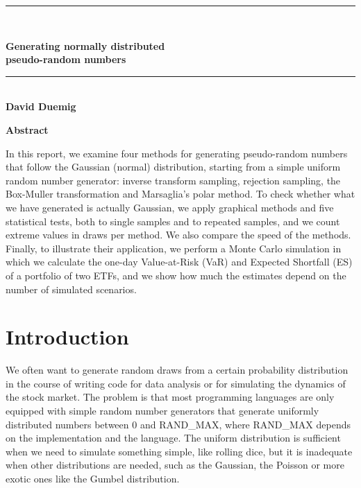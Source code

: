 \documentclass[12pt,a4paper]{article}
\begin{document}
\thispagestyle{empty}
\vspace*{1.2cm}
\begin{center}
\rule{\textwidth}{3pt}\\[2pt]
{\fontsize{20}{24}\selectfont\bfseries Generating normally distributed\\ pseudo-random numbers\par}
\vspace{2pt}
\rule{\textwidth}{1.5pt}\\[14pt]
{\bfseries David Duemig}
\end{center}

\vspace{2.2cm}
\begin{center}
{\fontsize{16}{19}\selectfont\bfseries Abstract}
\end{center}
\vspace{-6pt}
\begin{list}{}{\leftmargin=1.9cm\rightmargin=1.9cm}\item[]
In this report, we examine four methods for generating pseudo-random numbers that follow the Gaussian (normal) distribution, starting from a simple uniform random number generator: inverse transform sampling, rejection sampling, the Box-Muller transformation and Marsaglia's polar method. To check whether what we have generated is actually Gaussian, we apply graphical methods and five statistical tests, both to single samples and to \Reps{} repeated samples, and we count extreme values in \TailDraws{} draws per method. We also compare the speed of the methods. Finally, to illustrate their application, we perform a Monte Carlo simulation in which we calculate the one-day Value-at-Risk (VaR) and Expected Shortfall (ES) of a portfolio of two ETFs, and we show how much the estimates depend on the number of simulated scenarios.
\end{list}

\vspace{1.2cm}
\section{Introduction}

We often want to generate random draws from a certain probability distribution in the course of writing code for data analysis or for simulating the dynamics of the stock market. The problem is that most programming languages are only equipped with simple random number generators that generate uniformly distributed numbers between 0 and RAND\_MAX, where RAND\_MAX depends on the implementation and the language. The uniform distribution is sufficient when we need to simulate something simple, like rolling dice, but it is inadequate when other distributions are needed, such as the Gaussian, the Poisson or more exotic ones like the Gumbel distribution.
\end{document}
